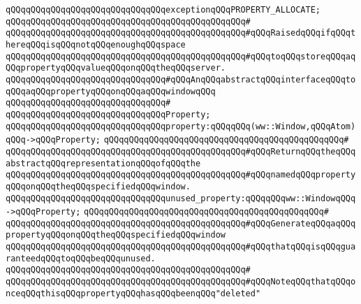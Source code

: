 \newline
\verb|qQQqqQQqqQQqqQQqqQQqqQQqqQQqqQQqexceptionqQQqPROPERTY_ALLOCATE;|\newline
\verb|qQQqqQQqqQQqqQQqqQQqqQQqqQQqqQQqqQQqqQQqqQQqqQQq#|\newline
\verb|qQQqqQQqqQQqqQQqqQQqqQQqqQQqqQQqqQQqqQQqqQQqqQQq#qQQqRaisedqQQqifqQQqthereqQQqisqQQqnotqQQqenoughqQQqspace|\newline
\verb|qQQqqQQqqQQqqQQqqQQqqQQqqQQqqQQqqQQqqQQqqQQqqQQq#qQQqtoqQQqstoreqQQqaqQQqpropertyqQQqvalueqQQqonqQQqtheqQQqserver.|\newline
\newline
\newline
\verb|qQQqqQQqqQQqqQQqqQQqqQQqqQQqqQQq#qQQqAnqQQqabstractqQQqinterfaceqQQqtoqQQqaqQQqpropertyqQQqonqQQqaqQQqwindowqQQq|\newline
\verb|qQQqqQQqqQQqqQQqqQQqqQQqqQQqqQQq#|\newline
\verb|qQQqqQQqqQQqqQQqqQQqqQQqqQQqqQQqProperty;|\newline
\newline
\verb|qQQqqQQqqQQqqQQqqQQqqQQqqQQqqQQqproperty:qQQqqQQq(ww::Window,qQQqAtom)qQQq->qQQqProperty;|\newline
\verb|qQQqqQQqqQQqqQQqqQQqqQQqqQQqqQQqqQQqqQQqqQQqqQQq#|\newline
\verb|qQQqqQQqqQQqqQQqqQQqqQQqqQQqqQQqqQQqqQQqqQQqqQQq#qQQqReturnqQQqtheqQQqabstractqQQqrepresentationqQQqofqQQqthe|\newline
\verb|qQQqqQQqqQQqqQQqqQQqqQQqqQQqqQQqqQQqqQQqqQQqqQQq#qQQqnamedqQQqpropertyqQQqonqQQqtheqQQqspecifiedqQQqwindow.|\newline
\newline
\newline
\verb|qQQqqQQqqQQqqQQqqQQqqQQqqQQqqQQqunused_property:qQQqqQQqww::WindowqQQq->qQQqProperty;|\newline
\verb|qQQqqQQqqQQqqQQqqQQqqQQqqQQqqQQqqQQqqQQqqQQqqQQq#|\newline
\verb|qQQqqQQqqQQqqQQqqQQqqQQqqQQqqQQqqQQqqQQqqQQqqQQq#qQQqGenerateqQQqaqQQqpropertyqQQqonqQQqtheqQQqspecifiedqQQqwindow|\newline
\verb|qQQqqQQqqQQqqQQqqQQqqQQqqQQqqQQqqQQqqQQqqQQqqQQq#qQQqthatqQQqisqQQqguaranteedqQQqtoqQQqbeqQQqunused.|\newline
\verb|qQQqqQQqqQQqqQQqqQQqqQQqqQQqqQQqqQQqqQQqqQQqqQQq#|\newline
\verb|qQQqqQQqqQQqqQQqqQQqqQQqqQQqqQQqqQQqqQQqqQQqqQQq#qQQqNoteqQQqthatqQQqonceqQQqthisqQQqpropertyqQQqhasqQQqbeenqQQq"deleted"|\newline
